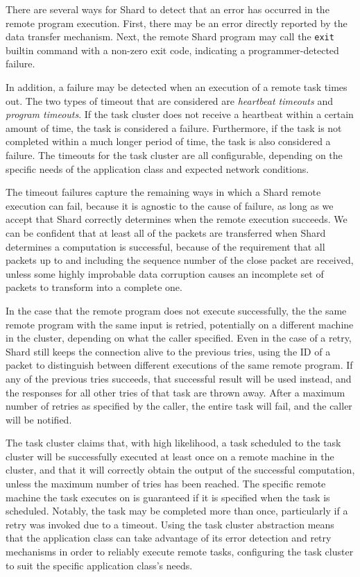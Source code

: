 \documentclass[oneside]{report}
\begin{document}
There are several ways for Shard to detect that an error has occurred in the remote program execution.
First, there may be an error directly reported by the data transfer mechanism.
Next, the remote Shard program may call the \texttt{exit} builtin command with a non-zero exit code, indicating a programmer-detected failure.

In addition, a failure may be detected when an execution of a remote task times out.
The two types of timeout that are considered are \textit{heartbeat timeouts} and \textit{program timeouts}.
If the task cluster does not receive a heartbeat within a certain amount of time, the task is considered a failure.
Furthermore, if the task is not completed within a much longer period of time, the task is also considered a failure.
The timeouts for the task cluster are all configurable, depending on the specific needs of the application class and expected network conditions.

The timeout failures capture the remaining ways in which a Shard remote execution can fail, because it is agnostic to the cause of failure, as long as we accept that Shard correctly determines when the remote execution succeeds.
We can be confident that at least all of the packets are transferred when Shard determines a computation is successful, because of the requirement that all packets up to and including the sequence number of the close packet are received, unless some highly improbable data corruption causes an incomplete set of packets to transform into a complete one.

In the case that the remote program does not execute successfully, the the same remote program with the same input is retried, potentially on a different machine in the cluster, depending on what the caller specified.
Even in the case of a retry, Shard still keeps the connection alive to the previous tries, using the ID of a packet to distinguish between different executions of the same remote program.
If any of the previous tries succeeds, that successful result will be used instead, and the responses for all other tries of that task are thrown away.
After a maximum number of retries as specified by the caller, the entire task will fail, and the caller will be notified.

The task cluster claims that, with high likelihood, a task scheduled to the task cluster will be successfully executed at least once on a remote machine in the cluster, and that it will correctly obtain the output of the successful computation, unless the maximum number of tries has been reached.
The specific remote machine the task executes on is guaranteed if it is specified when the task is scheduled.
Notably, the task may be completed more than once, particularly if a retry was invoked due to a timeout.
Using the task cluster abstraction means that the application class can take advantage of its error detection and retry mechanisms in order to reliably execute remote tasks, configuring the task cluster to suit the specific application class's needs.
\end{document}
